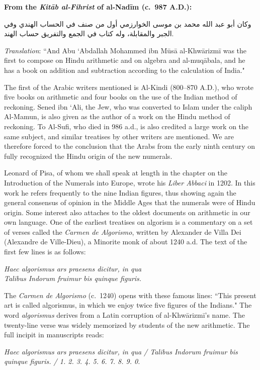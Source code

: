 \documentclass[11pt,a4paper]{article}
\newcommand{\ar}[1]{{\arabicfont #1}}
\newenvironment{arabicpassage}{%
  \begin{tcolorbox}[colback=arabicbg,colframe=rulecolor,boxrule=0.5pt,
    left=8pt,right=8pt,top=6pt,bottom=6pt,fontupper=\arabicfont\large]
}{\end{tcolorbox}}
\newenvironment{latinpassage}{%
  \begin{tcolorbox}[colback=latinbg,colframe=rulecolor,boxrule=0.5pt,
    left=8pt,right=8pt,top=6pt,bottom=6pt,fontupper=\itshape]
}{\end{tcolorbox}}
\newenvironment{enhancednote}{%
  \begin{tcolorbox}[colback=enhancedbg,colframe=notecolor,boxrule=1pt,
    left=10pt,right=10pt,top=8pt,bottom=8pt,
    title={\textbf{Enhanced Edition Note}},fonttitle=\bfseries\color{notecolor}]
}{\end{tcolorbox}}
\begin{document}
\begin{arabicpassage}
\textbf{From the \textit{Kit\=ab al-Fihrist} of al-Nad\=im (c.~987 A.D.):}

\vspace{0.5em}
\ar{وكان أبو عبد الله محمد بن موسى الخوارزمي أول من صنف في الحساب الهندي وفي الجبر والمقابلة، وله كتاب في الجمع والتفريق حساب الهند.}

\vspace{0.5em}
\textit{Translation}: ``And Abu `Abdallah Mohammed ibn M\=us\=a al-Khw\=arizm\=i was the first to compose on Hindu arithmetic and on algebra and al-muq\=abala, and he has a book on addition and subtraction according to the calculation of India."
\end{arabicpassage}

The first of the Arabic writers mentioned is Al-Kindi (800--870 A.D.), who wrote five books on arithmetic and four books on the use of the Indian method of reckoning. Sened ibn `Ali, the Jew, who was converted to Islam under the caliph Al-Mamun, is also given as the author of a work on the Hindu method of reckoning. To Al-Sufi, who died in 986 a.d., is also credited a large work on the same subject, and similar treatises by other writers are mentioned. We are therefore forced to the conclusion that the Arabs from the early ninth century on fully recognized the Hindu origin of the new numerals.

Leonard of Pisa, of whom we shall speak at length in the chapter on the Introduction of the Numerals into Europe, wrote his \textit{Liber Abbaci} in 1202. In this work he refers frequently to the nine Indian figures, thus showing again the general consensus of opinion in the Middle Ages that the numerals were of Hindu origin. Some interest also attaches to the oldest documents on arithmetic in our own language. One of the earliest treatises on algorism is a commentary on a set of verses called the \textit{Carmen de Algorismo}, written by Alexander de Villa Dei (Alexandre de Ville-Dieu), a Minorite monk of about 1240 a.d. The text of the first few lines is as follows:

\begin{latinpassage}
\textit{Haec algorismus ars praesens dicitur, in qua}\\
\textit{Talibus Indorum fruimur bis quinque figuris.}
\end{latinpassage}

\begin{enhancednote}
The \textit{Carmen de Algorismo} (c.~1240) opens with these famous lines: ``This present art is called algorismus, in which we enjoy twice five figures of the Indians." The word \textit{algorismus} derives from a Latin corruption of al-Khw\=arizm\=i's name. The twenty-line verse was widely memorized by students of the new arithmetic. The full incipit in manuscripts reads:

\vspace{0.3em}
\textit{Haec algorismus ars praesens dicitur, in qua / Talibus Indorum fruimur bis quinque figuris. / 1. 2. 3. 4. 5. 6. 7. 8. 9. 0.}
\end{enhancednote}
\end{document}
